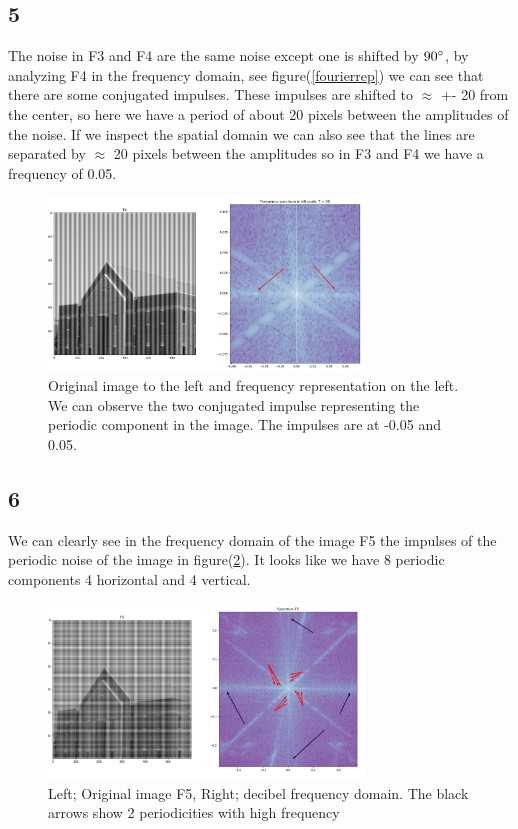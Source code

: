 {\subsection{5}


The noise in F3 and F4 are the same noise except one is shifted by $90\degree$, by analyzing F4 in the frequency domain, see figure(\ref{fourierrep}) we can see that there are some conjugated impulses. These impulses are shifted to $\approx$ +- 20 from the center, so here we have a period of about 20 pixels between the amplitudes of the noise. If we inspect the spatial domain we can also see that the lines are separated by $\approx$ 20 pixels between the amplitudes so in F3 and F4 we have a frequency of 0.05.

\begin{figure}[!htb]
    {\centering
        \includegraphics[width=0.75\textwidth]{simulatedperiod.png}
        \caption{Original image to the left and frequency representation on the left. We can observe the two conjugated impulse representing the periodic component in the image. The impulses are at -0.05 and 0.05.}
        \label{simulatedperiod}
    \par}
    \end{figure}




\subsection{6}


We can clearly see in the frequency domain of the image F5 the impulses of the periodic noise of the image in figure(\ref{F5period}). It looks like we have 8 periodic components 4 horizontal and 4 vertical.


\begin{figure}[!htb]
    {\centering
        \includegraphics[width=0.75\textwidth]{superpositionfreq.png}
        \caption{Left; Original image F5, Right; decibel frequency domain. The black arrows show 2 periodicities with high frequency}
        \label{F5period}
    \par}
    \end{figure}


}
